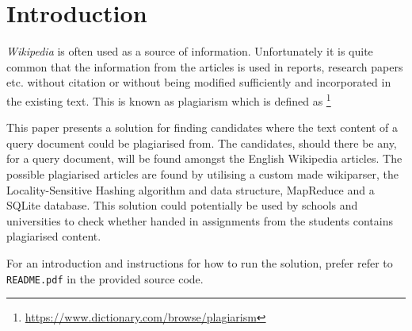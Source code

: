 \section{Introduction}


\emph{Wikipedia} is often used as a source of information. Unfortunately it is quite common that the information from the articles is used in reports, research papers etc. without citation or without being modified sufficiently and incorporated in the existing text. This is known as plagiarism which is defined as \emph{}\footnote{\url{https://www.dictionary.com/browse/plagiarism}}

This paper presents a solution for finding candidates where the text content of a query document could be plagiarised from. The candidates, should there be any, for a query document, will be found amongst the English Wikipedia articles. The possible plagiarised articles are found by utilising a custom made wikiparser, the Locality-Sensitive Hashing algorithm and data structure, MapReduce and a SQLite database. This solution could potentially be used by schools and universities to check whether handed in assignments from the students contains plagiarised content.

For an introduction and instructions for how to run the solution, prefer refer to \verb=README.pdf= in the provided source code.